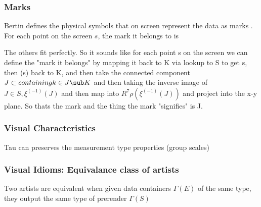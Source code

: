 \documentclass[../intro.tex]{subfiles}
\begin{document}
\subsubsection{Marks}
Bertin defines the physical symbols that on screen represent the data as marks 
\cite{bertinIIPropertiesGraphic2011,carpendaleVisualRepresentationSemiology}. For each point on the screen $s$, the mark it belongs to is 

The others fit perfectly. So it sounds like for each point s on the screen we can define the "mark it belongs" by mapping it back to K via lookup to S to get s, then \xi(s) back to K, and then take the connected component $J \subset containing k\in J \sub K $ and then taking the inverse image of $J \in S, \xi^(-1)(J)$ and then map into $R^7  \rho(\xi^(-1)(J))$ and project into the x-y plane. So thats the mark and the thing the mark "signifies" is J.




\subsubsection{Visual Characteristics}
Tau can preserves the measurement type properties (group scales)


\subsubsection{Visual Idioms: Equivalance class of artists}
Two artists are equivalent when given data containers $\Gamma(E)$ of the same type, they output the same type of prerender $\Gamma(S)$ 
\end{document}
